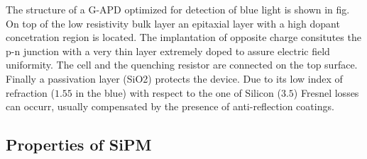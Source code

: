 The structure of a G-APD optimized for detection of blue light is shown in fig.
On top of the low resistivity bulk layer an epitaxial layer with a high dopant concetration region is located.
The implantation of opposite charge consitutes the p-n junction with a very thin layer extremely doped to assure electric field uniformity.
The cell and the quenching resistor are connected on the top surface.
Finally a passivation layer (SiO2) protects the device. Due to its low index of refraction ($1.55$ in the blue) with respect to the one of Silicon ($3.5$) Fresnel losses can occurr, usually compensated by the presence of anti-reflection coatings.



\subsection{Properties of SiPM}

